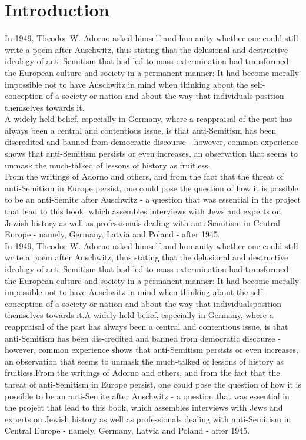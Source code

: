 \section{Introduction}
In 1949, Theodor W. Adorno asked himself and humanity whether one could still write a poem after Auschwitz, thus stating that the delusional and destructive ideology of anti-Semitism that had led to mass extermination had transformed the European culture and society in a permanent manner: It had become morally impossible not to have Auschwitz in mind when thinking about the self-conception of a society or nation and about the way that individuals position themselves towards it.  \\
A widely held belief, especially in Germany, where a reappraisal of the past has always been a central and contentious issue, is that anti-Semitism has been discredited and banned from democratic discourse - however, common experience shows that anti-Semitism persists or even increases, an observation that seems to unmask the much-talked of lessons of history as fruitless.  \\
From the writings of Adorno and others, and from the fact that the threat of anti-Semitism in Europe persist, one could pose the question of how it is possible to be an anti-Semite after Auschwitz - a question that was essential in the project that lead to this book, which assembles interviews with Jews and experts on Jewish history as well as professionals dealing with anti-Semitism in Central Europe - namely, Germany, Latvia and Poland -  after 1945.  \\

In 1949, Theodor W. Adorno asked himself and humanity whether one could still write a poem after Auschwitz, thus stating that the delusional and destructive ideology of anti-Semitism that had led to mass extermination had transformed the European culture and society in a permanent manner: It had become morally impossible not to have Auschwitz in mind when thinking about the self-conception of a society or nation and about the way that individualsposition themselves towards it.A widely held belief, especially in Germany, where a reappraisal of the past has always been a central and contentious issue, is that anti-Semitism has been dis-credited and banned from democratic discourse - however, common experience shows that anti-Semitism persists or even increases, an observation that seems to unmask the much-talked of lessons of history as fruitless.From the writings of Adorno and others, and from the fact that the threat of anti-Semitism in Europe persist, one could pose the question of how it is possible to be an anti-Semite after Auschwitz - a question that was essential in the project that lead to this book, which assembles interviews with Jews and experts on Jewish history as well as professionals dealing with anti-Semitism in Central Europe - namely, Germany, Latvia and Poland - after 1945.

